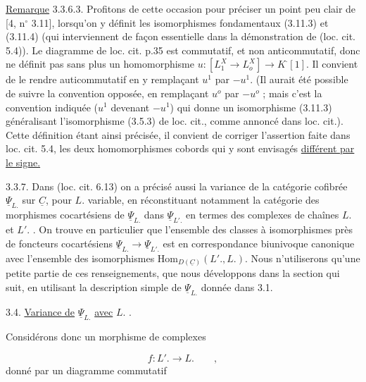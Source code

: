 \underline{Remarque} 3.3.6.3. Profitons de cette occasion pour préciser un point peu clair de [4, n$^{\circ}$ 3.11], lorsqu'on y définit les isomorphismes fondamentaux (3.11.3) et (3.11.4) (qui interviennent de façon essentielle dans la démonstration de (loc. cit. 5.4)). Le diagramme de loc. cit. p.35 est commutatif, et non anticommutatif, donc ne définit pas sans plus un homomorphisme $u : [L_1^X \longrightarrow L_o^X] \longrightarrow K^{\cdot}[1]$. Il convient de le rendre auticommutatif en y remplaçant $u^1$ par $-u^1$. (Il aurait été possible de suivre la convention opposée, en remplaçant $u^o$ par $-u^o$ ; mais c'est la convention indiquée ($u^1$ devenant $-u^1$) qui donne un isomorphisme (3.11.3) généralisant l'isomorphisme (3.5.3) de loc. cit., comme annoncé dans loc. cit.). Cette définition étant ainsi précisée, il convient de corriger l'assertion faite dans loc. cit. 5.4, les deux homomorphismes cobords qui
y sont envisagés \underline{différent par le signe.}

3.3.7. Dans (loc. cit. 6.13) on a précisé aussi la variance de la catégorie cofibrée $\underline{\Psi}_{L.}$ sur $\underline{C}$, pour $L.$ variable, en réconstituant notamment la catégorie des morphismes cocartésiens de $\underline{\Psi}_{L.}$ dans $\underline{\Psi}_{L'.}$ en termes des complexes de chaînes $L.$ et $L'.$ . On trouve en particulier que l'ensemble des classes à isomorphismes près de foncteurs cocartésiens $\underline{\Psi}_{L.} \longrightarrow \underline{\Psi}_{L'.}$ est en correspondance biunivoque canonique avec l'ensemble des isomorphismes $\mathrm{Hom}_{D(\underline{C})}(L'. ,L.)$. Nous n'utiliserons qu'une petite partie de ces renseignements, que nous développons dans la section qui suit, en utilisant la description simple de $\underline{\Psi}_{L.}$ donnée dans 3.1.


3.4. \underline{Variance de} $\underline{\Psi}_{L.}$ \underline{avec} $L.$ .

Considérons donc un morphisme de complexes

\begin{equation}\tag{3.4.1}
f : L'. \longrightarrow L. \qquad ,
\end{equation}
donné par un diagramme commutatif

